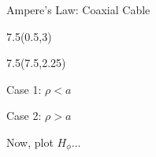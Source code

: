 \begin{frame}{Ampere's Law: Coaxial Cable}
\begin{textblock}{7.5}(0.5,3)
	
\end{textblock}
\begin{textblock}{7.5}(7.5,2.25)
\begin{myblock}[0.9]{Case 1: $\rho<a$ }
\vspace{-18pt}
    \vspace{-18pt}
\end{myblock}
\begin{myblock}[0.9]{Case 2: $\rho>a$}
    \vspace{-18pt}
    \vspace{-18pt}
\end{myblock}

\hspace{0.75in} Now, plot $H_{\phi}$...

\end{textblock}
\end{frame}

